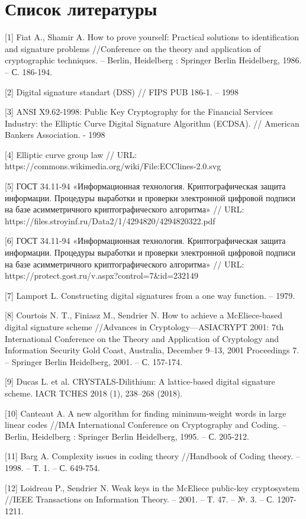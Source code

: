 \documentclass[colorthm]{./civarticle}
\begin{document}
\section{Список литературы}
[1] Fiat A., Shamir A. How to prove yourself: Practical solutions to identification and signature problems //Conference on the theory and application of cryptographic techniques. – Berlin, Heidelberg : Springer Berlin Heidelberg, 1986. – С. 186-194.

[2] Digital signature standart (DSS) // FIPS PUB 186-1. – 1998

[3] ANSI X9.62-1998: Public Key Cryptography for the Financial Services Industry: the Elliptic Curve Digital Signature Algorithm (ECDSA). // American Bankers Association. - 1998

[4] Elliptic curve group law // URL: https://commons.wikimedia.org/wiki/File:ECClines-2.0.svg

[5] ГОСТ 34.11-94 «Информационная технология. Криптографическая защита информации. Процедуры выработки и проверки электронной цифровой подписи на базе асимметричного криптографического алгоритма» // URL: https://files.stroyinf.ru/Data2/1/4294820/4294820322.pdf

[6] ГОСТ 34.11-94 «Информационная технология. Криптографическая защита информации. Процедуры выработки и проверки электронной цифровой подписи на базе асимметричного криптографического алгоритма» // URL: https://protect.gost.ru/v.aspx?control=7&id=232149

[7] Lamport L. Constructing digital signatures from a one way function. – 1979.

[8] Courtois N. T., Finiasz M., Sendrier N. How to achieve a McEliece-based digital signature scheme //Advances in Cryptology—ASIACRYPT 2001: 7th International Conference on the Theory and Application of Cryptology and Information Security Gold Coast, Australia, December 9–13, 2001 Proceedings 7. – Springer Berlin Heidelberg, 2001. – С. 157-174.

[9] Ducas L. et al. CRYSTALS-Dilithium: A lattice-based digital signature scheme. IACR TCHES 2018 (1), 238–268 (2018).

[10] Canteaut A. A new algorithm for finding minimum-weight words in large linear codes //IMA International Conference on Cryptography and Coding. – Berlin, Heidelberg : Springer Berlin Heidelberg, 1995. – С. 205-212.

[11] Barg A. Complexity issues in coding theory //Handbook of Coding theory. – 1998. – Т. 1. – С. 649-754.

[12] Loidreau P., Sendrier N. Weak keys in the McEliece public-key cryptosystem //IEEE Transactions on Information Theory. – 2001. – Т. 47. – №. 3. – С. 1207-1211.
\end{document}
